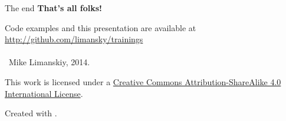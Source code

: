 \begin{frame}{The end}
\centering
\textbf{That's all folks!}

Code examples and this presentation are available at \url{http://github.com/limansky/trainings}\\~\\

\scriptsize{\ccbysa \ Mike Limanskiy, 2014.}
\vfill
\vfill
\tiny{This work is licensed under a \href{http://creativecommons.org/licenses/by-sa/4.0/}{Creative Commons Attribution-ShareAlike 4.0 International License}. 

Created with \LaTeXe.}
\end{frame}

